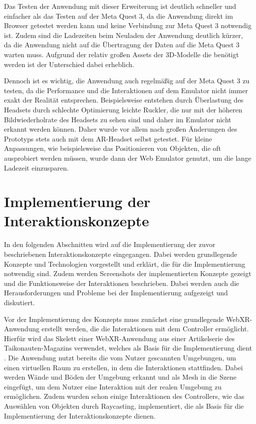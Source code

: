 Das Testen der Anwendung mit dieser Erweiterung ist deutlich schneller und einfacher als das Testen auf der Meta Quest 3, da die Anwendung direkt im Browser getestet werden kann und keine Verbindung zur Meta Quest 3 notwendig ist.
Zudem sind die Ladezeiten beim Neuladen der Anwendung deutlich kürzer, da die Anwendung nicht auf die Übertragung der Daten auf die Meta Quest 3 warten muss.
Aufgrund der relativ großen Assets der 3D-Modelle die benötigt werden ist der Unterschied dabei erheblich.

Dennoch ist es wichtig, die Anwendung auch regelmäßig auf der Meta Quest 3 zu testen, da die Performance und die Interaktionen auf dem Emulator nicht immer exakt der Realität entsprechen.
Beispielsweise entstehen durch Überlastung des Headsets durch schlechte Optimierung leichte Ruckler, die nur mit der höheren Bildwiederholrate des Headsets zu sehen sind und daher im Emulator nicht erkannt werden können.
Daher wurde vor allem nach großen Änderungen des Prototyps stets auch mit dem AR-Headset selbst getestet.
Für kleine Anpassungen, wie beispielsweise das Positionieren von Objekten, die oft ausprobiert werden müssen, wurde dann der Web Emulator genutzt, um die lange Ladezeit einzusparen.


\section{Implementierung der Interaktionskonzepte}

In den folgenden Abschnitten wird auf die Implementierung der zuvor beschriebenen Interaktionskonzepte eingegangen.
Dabei werden grundlegende Konzepte und Technologien vorgestellt und erklärt, die für die Implementierung notwendig sind.
Zudem werden Screenshots der implementierten Konzepte gezeigt und die Funktionsweise der Interaktionen beschrieben.
Dabei werden auch die Herausforderungen und Probleme bei der Implementierung aufgezeigt und diskutiert.

Vor der Implementierung des Konzepts muss zunächst eine grundlegende WebXR-Anwendung erstellt werden, die die Interaktionen mit dem Controller ermöglicht.
Hierfür wird das Skelett einer WebXR-Anwendung aus einer Artikelserie des Taikonauten-Magazins verwendet, welches als Basis für die Implementierung dient \autocite[][]{taikonauten-magazine}.
Die Anwendung nutzt bereits die vom Nutzer gescannten Umgebungen, um einen virtuellen Raum zu erstellen, in dem die Interaktionen stattfinden.
Dabei werden Wände und Böden der Umgebung erkannt und als Mesh in die Szene eingefügt, um dem Nutzer eine Interaktion mit der realen Umgebung zu ermöglichen.
Zudem wurden schon einige Interaktionen des Controllers, wie das Auswählen von Objekten durch Raycasting, implementiert, die als Basis für die Implementierung der Interaktionskonzepte dienen.

